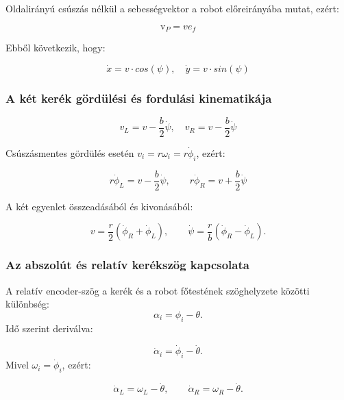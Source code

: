 \documentclass[12pt,a4paper]{report}
\begin{document}
	Oldalirányú csúszás nélkül a sebességvektor a robot előreirányába mutat, ezért:
	
	\begin{equation}
		\text{v}_P = v e_f
	\end{equation}
	
	
	Ebből következik, hogy:
	
	\begin{equation}
	\dot{x} = v \cdot cos(\psi), \quad \dot{y} = v \cdot sin(\psi)
	\end{equation}
	
	\subsubsection{A két kerék gördülési és fordulási kinematikája}

	
	\begin{equation}
		v_L = v - \frac{b}{2} \dot{\psi}, \quad v_R = v - \frac{b}{2} \dot{\psi}
	\end{equation}
	
	Csúszásmentes gördülés esetén \(v_i=r\omega_i=r\dot\phi_i\), ezért:
	
	\begin{equation}
		r\dot\phi_L=v-\frac{b}{2}\dot\psi,
		\qquad
		r\dot\phi_R=v+\frac{b}{2}\dot\psi
	\end{equation}
	
	
	A két egyenlet összeadásából és kivonásából:
	
	\begin{equation}
		\boxed{v=\frac{r}{2}\left(\dot\phi_R+\dot\phi_L\right)},
		\qquad
		\boxed{\dot\psi=\frac{r}{b}\left(\dot\phi_R-\dot\phi_L\right)}.
	\end{equation}
	
	\subsubsection{Az abszolút és relatív kerékszög kapcsolata}
	A relatív encoder-szög a kerék és a robot főtestének szöghelyzete közötti különbség:
	\begin{equation}
	\alpha_i=\phi_i-\theta.
	\end{equation}
	Idő szerint deriválva:
	
	\begin{equation}
	\dot\alpha_i=\dot\phi_i-\dot\theta.	
	\end{equation}
	Mivel \(\omega_i=\dot\phi_i\), ezért:
	
	\begin{equation}
		\boxed{\dot\alpha_L=\omega_L-\dot\theta,\qquad
			\dot\alpha_R=\omega_R-\dot\theta.}
	\end{equation}
	
\end{document}
